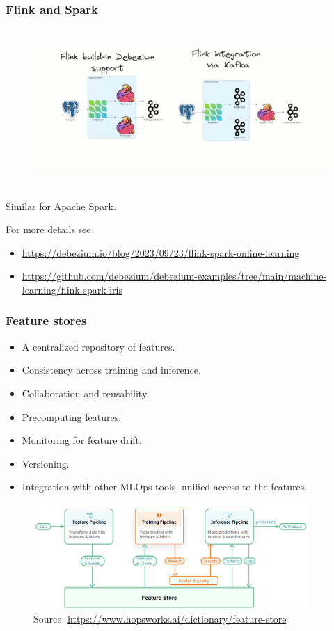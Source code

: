\documentclass[10pt,utf8]{beamer}
\begin{document}
\begin{frame}
    \frametitle{Flink and Spark}
    \begin{figure}
        \hspace*{-1.1cm}
        \includegraphics[height=6cm]{./img/debezium_flink.eps}
    \end{figure}
    
    \vspace{-1cm}
    Similar for Apache Spark.
    \vspace{0.5cm}
    
    For more details see
    \begin{itemize}
        \item  \footnotesize \color{blue}\url{https://debezium.io/blog/2023/09/23/flink-spark-online-learning}
        \item  \footnotesize \url{https://github.com/debezium/debezium-examples/tree/main/machine-learning/flink-spark-iris}\color{black}
    \end{itemize}
\end{frame}

\begin{frame}
    \frametitle{Feature stores}
    \begin{itemize}
        \item A centralized repository of features.
        \item Consistency across training and inference.
        \item Collaboration and reusability.
        \item Precomputing features.
        \item Monitoring for feature drift.
        \item Versioning.
        \item Integration with other MLOps tools, unified access to the features.
    \end{itemize}

     \begin{figure}
        \centering
        \includegraphics[height=4cm]{./img/featurestore.eps}
        \caption{\tiny{Source: \url{https://www.hopsworks.ai/dictionary/feature-store}}}
    \end{figure}
\end{frame}
\end{document}
